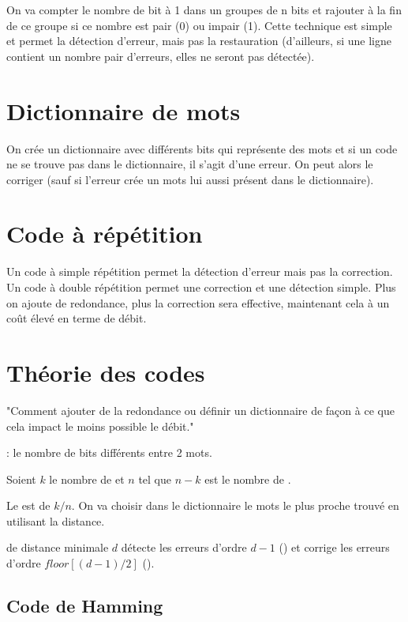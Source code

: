 On va compter le nombre de bit à 1 dans un groupes de n bits et rajouter à la fin de ce groupe si ce nombre est pair (0) ou impair (1). Cette technique est simple et permet la détection d'erreur, mais pas la restauration (d'ailleurs, si une ligne contient un nombre pair d'erreurs, elles ne seront pas détectée).

\section{Dictionnaire de mots}

On crée un dictionnaire avec différents bits qui représente des mots et si un code ne se trouve pas dans le dictionnaire, il s'agit d'une erreur. On peut alors le corriger (sauf si l'erreur crée un mots lui aussi présent dans le dictionnaire).

\section{Code à répétition}

Un code à simple répétition permet la détection d'erreur mais pas la correction. Un code à double répétition permet une correction et une détection simple. Plus on ajoute de redondance, plus la correction sera effective, maintenant cela à un coût élevé en terme de débit.

\section{Théorie des codes}

"Comment ajouter de la redondance ou définir un dictionnaire de façon à ce que cela impact le moins possible le débit."

: le nombre de bits différents entre 2 mots.

Soient $k$ le nombre de  et $n$ tel que $n-k$ est le nombre de .

Le  est de $k/n$. On va choisir dans le dictionnaire le mots le plus proche trouvé en utilisant la distance.

 de distance minimale $d$ détecte les erreurs d'ordre $d-1$ () et corrige les erreurs d'ordre $floor[(d-1)/2]$ ().

\subsection{Code de Hamming}

